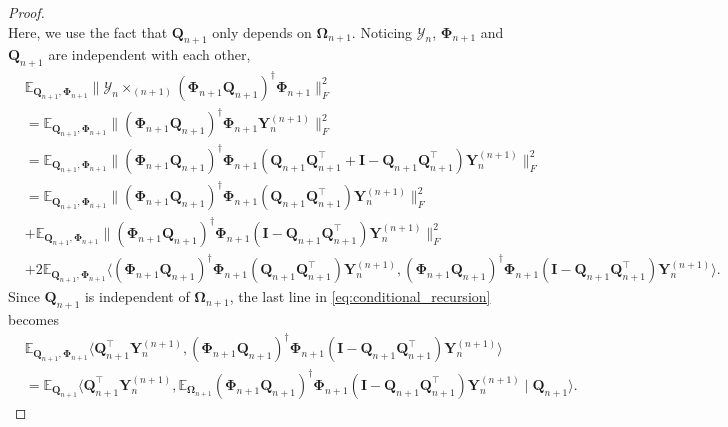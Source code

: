 \begin{lem}
\begin{proof}
\begin{equation}
\end{equation}
Here, we use the fact that $\mathbf{Q}_{n+1}$ only depends on $\mathbf{\Omega}_{n+1}$. Noticing $\mathscr{Y}_n$, $\mathbf{\Phi}_{n+1}$ and $\mathbf{Q}_{n+1}$ are independent with each other, 
\begin{equation}
\label{eq:conditional_recursion}
\begin{aligned}
&\mathbb{E}_{\mathbf{Q}_{n+1}, \mathbf{\Phi}_{n+1}}  \|\mathscr{Y}_n\times_{(n+1)} (\mathbf{\Phi}_{n+1}\mathbf{Q}_{n+1})^\dag \mathbf{\Phi}_{n+1}\|_F^2\\
& = \mathbb{E}_{\mathbf{Q}_{n+1}, \mathbf{\Phi}_{n+1}} \|(\mathbf{\Phi}_{n+1}\mathbf{Q}_{n+1})^\dag \mathbf{\Phi}_{n+1} \mathbf{Y}_n^{(n+1)}\|_F^2\\
& = \mathbb{E}_{\mathbf{Q}_{n+1}, \mathbf{\Phi}_{n+1}} \|(\mathbf{\Phi}_{n+1}\mathbf{Q}_{n+1})^\dag \mathbf{\Phi}_{n+1}(\mathbf{Q}_{n+1}\mathbf{Q}_{n+1}^\top +\mathbf{I}-\mathbf{Q}_{n+1}\mathbf{Q}_{n+1}^\top ) \mathbf{Y}_n^{(n+1)}\|_F^2\\
& = \mathbb{E}_{\mathbf{Q}_{n+1}, \mathbf{\Phi}_{n+1}} \|(\mathbf{\Phi}_{n+1}\mathbf{Q}_{n+1})^\dag \mathbf{\Phi}_{n+1}(\mathbf{Q}_{n+1}\mathbf{Q}_{n+1}^\top)\mathbf{Y}_n^{(n+1)}\|_F^2\\
&+\mathbb{E}_{\mathbf{Q}_{n+1}, \mathbf{\Phi}_{n+1}} \|(\mathbf{\Phi}_{n+1}\mathbf{Q}_{n+1})^\dag \mathbf{\Phi}_{n+1}(\mathbf{I}-\mathbf{Q}_{n+1}\mathbf{Q}_{n+1}^\top)\mathbf{Y}_n^{(n+1)}\|_F^2\\
&+2\mathbb{E}_{\mathbf{Q}_{n+1}, \mathbf{\Phi}_{n+1}}  \langle(\mathbf{\Phi}_{n+1}\mathbf{Q}_{n+1})^\dag \mathbf{\Phi}_{n+1}(\mathbf{Q}_{n+1}\mathbf{Q}_{n+1}^\top)\mathbf{Y}_n^{(n+1)},  (\mathbf{\Phi}_{n+1}\mathbf{Q}_{n+1})^\dag \mathbf{\Phi}_{n+1}(\mathbf{I}-\mathbf{Q}_{n+1}\mathbf{Q}_{n+1}^\top)\mathbf{Y}_n^{(n+1)}\rangle. 
\end{aligned}
\end{equation}
Since $\mathbf{Q}_{n+1}$ is independent of $\mathbf{\Omega}_{n+1}$, the last line in \eqref{eq:conditional_recursion} becomes 
\begin{equation}
\begin{aligned}
&\mathbb{E}_{\mathbf{Q}_{n+1}, \mathbf{\Phi}_{n+1}}  \langle\mathbf{Q}_{n+1}^\top\mathbf{Y}_n^{(n+1)},  (\mathbf{\Phi}_{n+1}\mathbf{Q}_{n+1})^\dag \mathbf{\Phi}_{n+1}(\mathbf{I}-\mathbf{Q}_{n+1}\mathbf{Q}_{n+1}^\top)\mathbf{Y}_n^{(n+1)}\rangle\\
&= \mathbb{E}_{\mathbf{Q}_{n+1}} \langle\mathbf{Q}_{n+1}^\top\mathbf{Y}_n^{(n+1)}, \mathbb{E}_{\mathbf{\Omega}_{n+1}}  (\mathbf{\Phi}_{n+1}\mathbf{Q}_{n+1})^\dag \mathbf{\Phi}_{n+1}(\mathbf{I}-\mathbf{Q}_{n+1}\mathbf{Q}_{n+1}^\top)\mathbf{Y}_n^{(n+1)} \mid \mathbf{Q}_{n+1}\rangle. 
\end{aligned}
\end{equation}




\end{proof}
\end{lem}
